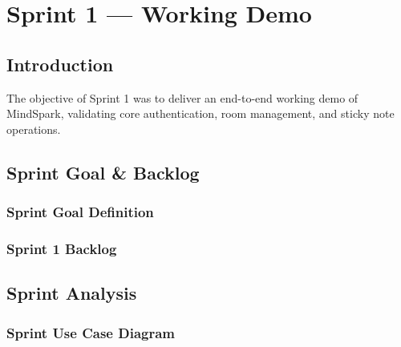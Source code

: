 
\chapter{Sprint 1 --- Working Demo}
\label{chap:sprint1}


\section{Introduction}
\label{sec:ch4_intro}
The objective of Sprint 1 was to deliver an end-to-end working demo of MindSpark, validating core authentication, room management, and sticky note operations.

\section{Sprint Goal \& Backlog}
\label{sec:ch4_goal_backlog}
\subsection{Sprint Goal Definition}
\label{subsec:ch4_sprint_goal}

\subsection{Sprint 1 Backlog}
\label{subsec:ch4_sprint_backlog}

\section{Sprint Analysis}
\label{sec:ch4_analysis}
\subsection{Sprint Use Case Diagram}
\label{subsec:ch4_use_case_diag}


